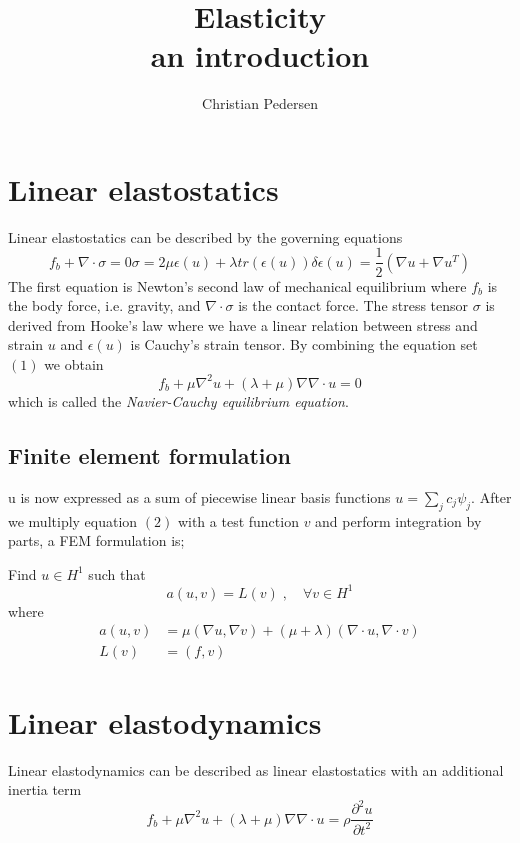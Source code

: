 \documentclass[11pt]{article}
\title{Elasticity \\ an introduction}
\author{Christian Pedersen}
\begin{document}
\maketitle


\section*{Linear elastostatics}

Linear elastostatics can be described by the governing equations
%
\begin{subequations}
\begin{equation}
f_b + \nabla\cdot \sigma  = 0
\end{equation}
\begin{equation}
\sigma = 2\mu\epsilon(u) + \lambda tr(\epsilon(u))\delta 
\end{equation}
\begin{equation}
\epsilon(u) = \frac{1}{2}\left(\nabla u + \nabla u^T \right)
\end{equation}
\end{subequations}
%
The first equation is Newton's second law of mechanical equilibrium where
$f_b$ is the body force, i.e. gravity, and $\nabla\cdot\sigma$ is the 
contact force. The stress tensor $\sigma$ is derived from Hooke's law 
where we have a linear relation between stress and strain $u$ and
 $\epsilon(u)$ is Cauchy's strain tensor.
By combining the equation set $(1)$ we obtain
%
\begin{equation}
f_b + \mu\nabla^2u + (\lambda + \mu)\nabla\nabla\cdot u = 0
\end{equation}
%
which is called the \textit{Navier-Cauchy equilibrium equation}.

\subsection*{Finite element formulation}

u is now expressed as a sum of piecewise linear basis functions
$u=\sum_j c_j\psi_j$. After we multiply equation $(2)$ with a test function 
$v$ and perform integration by parts, a FEM formulation is; 

Find $u\in H^1$ such that 
%
\begin{equation}
a(u,v) = L(v) \;, \quad \forall v \in H^1
\end{equation}
%
where
% 
\begin{equation}
\begin{split}
a(u, v) &= \mu(\nabla u, \nabla v) + (\mu + \lambda)(\nabla \cdot u, \nabla \cdot v)\\
L(v) &= (f, v)
\end{split}
\end{equation}
%



\section*{Linear elastodynamics}

Linear elastodynamics can be described as linear elastostatics with an additional inertia term
\begin{equation}
f_b + \mu\nabla^2u + (\lambda + \mu)\nabla\nabla\cdot u = \rho\frac{\partial^2 u}{\partial t^2}
\end{equation}
\end{document}
